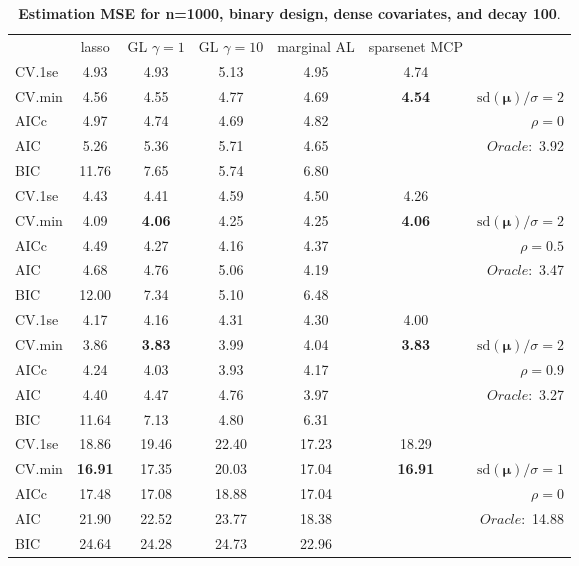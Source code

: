\clearpage
\begin{table}\vspace{-.5cm}
\caption[l]{ { \bf Estimation MSE for n=1000, binary design, 
dense covariates, and  decay  100}.}
\vspace{-.5cm}
\footnotesize{}
\begin{center}
\begin{tabular}{l*{5}{c}|r}
& lasso & GL $\gamma=1$ & GL $\gamma=10$ & marginal AL & sparsenet MCP  & \\
 \cline{1-7}
CV.1se & 4.93 & 4.93 & 5.13 & 4.95 & 4.74 & \\
CV.min & 4.56 & 4.55 & 4.77 & 4.69 & {\bf 4.54} &  $\mathrm{sd}(\mathbf{\mu})/\sigma=2$ \\
AICc & 4.97 & 4.74 & 4.69 & 4.82 & & $\rho=0$ \\
AIC & 5.26 & 5.36 & 5.71 & 4.65 & &  \multirow{2}{*}{$Oracle: $ 3.92} \\
BIC & 11.76 & 7.65 & 5.74 & 6.80 & &  \\
 \hline 
CV.1se & 4.43 & 4.41 & 4.59 & 4.50 & 4.26 & \\
CV.min & 4.09 & {\bf 4.06} & 4.25 & 4.25 & {\bf 4.06} &  $\mathrm{sd}(\mathbf{\mu})/\sigma=2$ \\
AICc & 4.49 & 4.27 & 4.16 & 4.37 & & $\rho=0.5$ \\
AIC & 4.68 & 4.76 & 5.06 & 4.19 & &  \multirow{2}{*}{$Oracle: $ 3.47} \\
BIC & 12.00 & 7.34 & 5.10 & 6.48 & &  \\
 \hline 
CV.1se & 4.17 & 4.16 & 4.31 & 4.30 & 4.00 & \\
CV.min & 3.86 & {\bf 3.83} & 3.99 & 4.04 & {\bf 3.83} &  $\mathrm{sd}(\mathbf{\mu})/\sigma=2$ \\
AICc & 4.24 & 4.03 & 3.93 & 4.17 & & $\rho=0.9$ \\
AIC & 4.40 & 4.47 & 4.76 & 3.97 & &  \multirow{2}{*}{$Oracle: $ 3.27} \\
BIC & 11.64 & 7.13 & 4.80 & 6.31 & &  \\
 \hline 
CV.1se & 18.86 & 19.46 & 22.40 & 17.23 & 18.29 & \\
CV.min & {\bf 16.91} & 17.35 & 20.03 & 17.04 & {\bf 16.91} &  $\mathrm{sd}(\mathbf{\mu})/\sigma=1$ \\
AICc & 17.48 & 17.08 & 18.88 & 17.04 & & $\rho=0$ \\
AIC & 21.90 & 22.52 & 23.77 & 18.38 & &  \multirow{2}{*}{$Oracle: $ 14.88} \\
BIC & 24.64 & 24.28 & 24.73 & 22.96 & &  \\

\end{tabular}
\end{center}
\end{table}
